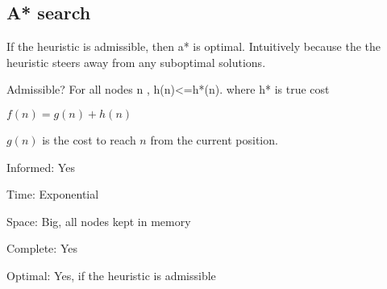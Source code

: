 
\subsection{A* search}

If the heuristic is admissible, then a* is optimal. Intuitively because the the heuristic steers away from any suboptimal solutions.

Admissible? For all nodes n , h(n)<=h*(n). where h* is true cost

\(f(n)=g(n)+h(n)\)

\(g(n)\) is the cost to reach \(n\) from the current position.

Informed: Yes

Time: Exponential

Space: Big, all nodes kept in memory

Complete: Yes

Optimal: Yes, if the heuristic is admissible

